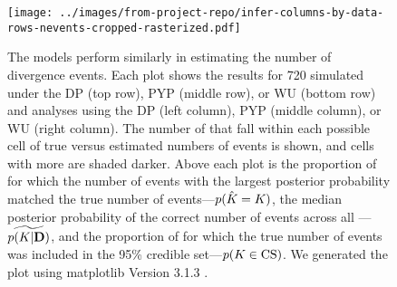 \begin{figure}[htbp]
    \begin{center}
        \texttt{[image: ../images/from-project-repo/infer-columns-by-data-rows-nevents-cropped-rasterized.pdf]}
        \captionsetup{listformat=sFigList}
        \caption{
        The models perform similarly in estimating the number of divergence
        events.
        Each plot shows the results for 720 \datasets
        simulated under the
        DP (top row),
        PYP (middle row),
        or
        WU (bottom row)
        and analyses using the
        DP (left column),
        PYP (middle column),
        or
        WU (right column).
        The number of \datasets that fall within each possible cell of true
        versus estimated numbers of events is shown, and cells with more
        \datasets are shaded darker.
        Above each plot is
        the proportion of \datasets for which the number of events with the largest
        posterior probability matched the true number of events---$p(\hat{K_{}}
        = K_{})$,
        the median posterior probability of the correct number of events across all
        \datasets---$\widetilde{p(K_{}|\mathbf{D})}$, and
        the proportion of \datasets for which the true number of events was
        included in the 95\% credible set---$p(K_{} \in
        \textrm{CS})$.
        We generated the plot using matplotlib Version 3.1.3
        \citep{matplotlib}.
        }
        \label{fig:neventsgrid}
    \end{center}
\end{figure}

